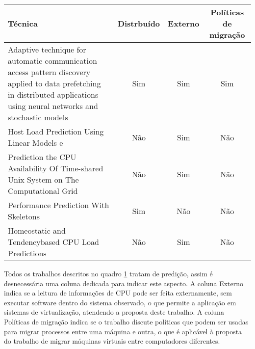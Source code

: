 \begin{table}
\centering
\hspace{-2cm} %
\label{quadro:relacionados}
\begin{tabular}{| m{5cm} | c | c | c |}
\hline
Técnica & Distrbuído & Externo & Políticas de migração \\
\hline
Adaptive technique for automatic communication access pattern discovery applied
to data prefetching in distributed applications using neural networks and
stochastic models \cite{dodonov2006adaptive} & Sim & Sim & Sim \\
\hline
Host Load Prediction Using Linear Models \cite{dinda2000host}
e \cite{dinda2002evaluation} & Não & Sim & Não \\
\hline
Prediction the CPU Availability Of Time-shared Unix System on The Computational
Grid \cite{wolski2000predicting} & Não & Sim & Não \\
\hline
Performance Prediction With Skeletons \cite{sodhi2008performance} & Sim & Não & Não \\
\hline
Homeostatic and Tendency\-based CPU Load Predictions \cite{yang2003homeostatic} & Não & Sim & Não \\
\hline

\end{tabular}
\end{table}

Todos os trabalhos descritos no quadro \ref{quadro:relacionados} tratam de
predição, assim é desnecessária uma coluna dedicada para indicar este aspecto.
A coluna Externo indica se a leitura de informações de CPU pode ser feita
externamente, sem executar software dentro do sistema observado, o que permite
a aplicação em sistemas de virtualização, atendendo a proposta deste trabalho.
A coluna Políticas de migração indica se o trabalho discute políticas que podem
ser usadas para migrar processos entre uma máquina e outra, o que é aplicável à
proposta do trabalho de migrar máquinas virtuais entre computadores diferentes.

